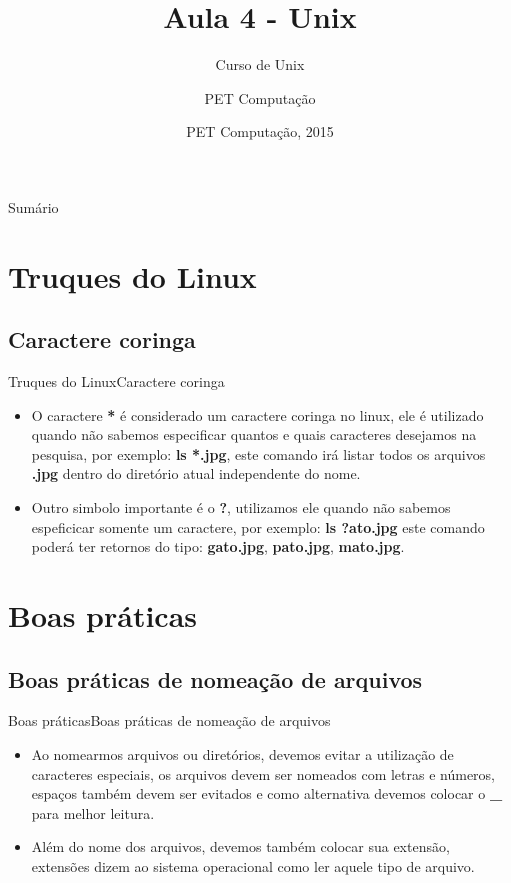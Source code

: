 \documentclass{beamer}
\title{Aula 4 - Unix}
\subtitle{Curso de Unix}
\author{PET Computa\c{c}ão}
\institute[UFSC] %
{
%
  Departamento de Informática e Estatística\\
  Universidade de Santa Catarina}
\date{PET Computa\c{c}ão, 2015}
\begin{document}
\begin{frame}
  \titlepage
\end{frame}

\begin{frame}{Sumário}
  \tableofcontents
\end{frame}

\section{Truques do Linux}

\subsection{Caractere coringa}

\begin{frame}{Truques do Linux}{Caractere coringa}
  \begin{itemize}
  \item {
   O caractere \textbf{*} é considerado um caractere coringa no linux, ele é utilizado quando não sabemos especificar quantos e quais caracteres desejamos na pesquisa, por exemplo: \textbf{ls *.jpg}, este comando irá listar todos os arquivos \textbf{.jpg} dentro do diretório atual independente do nome.
  }
  \item{Outro simbolo importante é o \textbf{?}, utilizamos ele quando não sabemos espeficicar somente um caractere, por exemplo:
  \textbf{ls ?ato.jpg} este comando poderá ter retornos do tipo: \textbf{gato.jpg},\textbf{ pato.jpg},\textbf{ mato.jpg}.}
 \end{itemize}
\end{frame}

\section{Boas práticas}
\subsection{Boas práticas de nomea\c{c}ão de arquivos}
\begin{frame}{Boas práticas}{Boas práticas de nomea\c{c}ão de arquivos}
  \begin{itemize}
  \item {
   Ao nomearmos arquivos ou diretórios, devemos evitar a utiliza\c{c}ão de caracteres especiais, os arquivos devem ser nomeados com letras e números, espa\c{c}os também devem ser evitados e como alternativa devemos colocar o \textbf{\_} para melhor leitura. 
  }
  \item{Além do nome dos arquivos, devemos também colocar sua extensão, extensões dizem ao sistema operacional como ler aquele tipo de arquivo.}
 \end{itemize}
 \end{frame}
 
\end{document}
